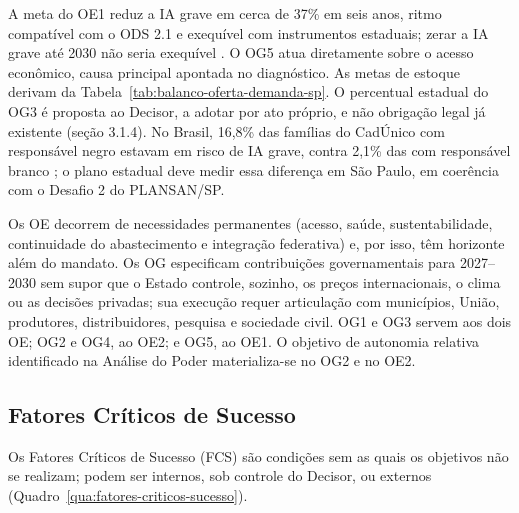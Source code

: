 \documentclass[
	12pt,				%
	openright,			%
	oneside,			%
	a4paper,			%
	chapter=TITLE,		%
	section=TITLE,		%
	english,			%
	french,				%
	spanish,			%
	brazil,				%
 ]{abntex2}
\begin{document}
A meta do OE1 reduz a IA grave em cerca de 37\% em seis anos, ritmo compatível
com o ODS 2.1 e exequível com instrumentos estaduais; zerar a IA grave até 2030
não seria exequível \cite[p. 41]{esg_fpn2024}. O OG5 atua diretamente sobre o
acesso econômico, causa principal apontada no diagnóstico. As metas de estoque
derivam da Tabela~\ref{tab:balanco-oferta-demanda-sp}. O percentual estadual do
OG3 é proposta ao Decisor, a adotar por ato próprio, e não obrigação legal já
existente (seção 3.1.4). No Brasil, 16,8\% das famílias do CadÚnico com
responsável negro estavam em risco de IA grave, contra 2,1\% das com
responsável branco \cite{mds_cadinsan2025}; o plano estadual deve medir essa
diferença em São Paulo, em coerência com o Desafio 2 do PLANSAN/SP.

Os OE decorrem de necessidades permanentes (acesso, saúde, sustentabilidade,
continuidade do abastecimento e integração federativa) e, por isso, têm
horizonte além do mandato. Os OG especificam contribuições governamentais para
2027--2030 sem supor que o Estado controle, sozinho, os preços internacionais, o
clima ou as decisões privadas; sua execução requer articulação com municípios,
União, produtores, distribuidores, pesquisa e sociedade civil. OG1 e OG3 servem
aos dois OE; OG2 e OG4, ao OE2; e OG5, ao OE1. O objetivo de autonomia relativa
identificado na Análise do Poder materializa-se no OG2 e no OE2.

\subsection{Fatores Críticos de Sucesso}
Os Fatores Críticos de Sucesso (FCS) são condições sem as quais os objetivos
não se realizam; podem ser internos, sob controle do Decisor, ou externos
 (Quadro~\ref{qua:fatores-criticos-sucesso}).
\end{document}
